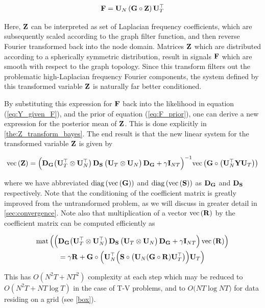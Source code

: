 \begin{equation}
    \label{eq:Z_transform}
    \mathbf{F} = \mathbf{U}_N \, (\mathbf{G} \circ \mathbf{Z}) \, \mathbf{U}_T^\top
\end{equation}

Here, $\mathbf{Z}$ can be interpreted as set of Laplacian frequency coefficients, which are subsequently scaled according to the graph filter function, and then reverse Fourier transformed back into the node domain. Matrices $\mathbf{Z}$ which are distributed according to a spherically symmetric distribution, result in signals $\mathbf{F}$ which are smooth with respect to the graph topology. Since this transform filters out the problematic high-Laplacian frequency Fourier components, the system defined by this transformed variable $\mathbf{Z}$ is naturally far better conditioned.

By substituting this expression for $\mathbf{F}$ back into the likelihood in equation (\ref{eq:Y_given_F}), and the prior of equation (\ref{eq:F_prior}), one can derive a new expression for the posterior mean of $\mathbf{Z}$. This is done explicitly in \cref{the:Z_transform_bayes}. The end result is that the new linear system for the transformed variable $\mathbf{Z}$ is given by


\begin{equation}
    \label{eq:Z_post}
    \text{\textup{vec}}\left(\mathbf{Z}\right) = \Big( \mathbf{D}_{\mathbf{G}} \big( \mathbf{U}_T^\top \otimes \mathbf{U}_N^\top \big)\, \mathbf{D}_{\mathbf{S}} \, \big(\mathbf{U}_T \otimes \mathbf{U}_N \big) \,\mathbf{D}_{\mathbf{G}} + \gamma \mathbf{I}_{NT} \Big)^{-1} \text{\textup{vec}}\left(\mathbf{G} \circ \big(\mathbf{U}_N^\top \mathbf{Y} \mathbf{U}_T\big)\right)
\end{equation}

\noindent where we have abbreviated $\text{\textup{diag}}\left(\text{\textup{vec}}\left(\mathbf{G}\right)\right)$ and $\text{\textup{diag}}\left(\text{\textup{vec}}\left(\mathbf{S}\right)\right)$ as $\mathbf{D}_{\mathbf{G}}$ and $\mathbf{D}_{\mathbf{S}}$ respectively. Note that the conditioning of the coefficient matrix is greatly improved from the untransformed problem, as we will discuss in greater detail in \cref{sec:convergence}. Note also that multiplication of a vector $\text{\textup{vec}}\left(\mathbf{R}\right)$ by the coefficient matrix can be computed efficiently as 

\begin{multline}
    \text{\textup{mat}}\left(\Big( \mathbf{D}_{\mathbf{G}} \big( \mathbf{U}_T^\top \otimes \mathbf{U}_N^\top \big)\, \mathbf{D}_{\mathbf{S}} \, \big(\mathbf{U}_T \otimes \mathbf{U}_N \big) \,\mathbf{D}_{\mathbf{G}} + \gamma \mathbf{I}_{NT} \Big) \, \text{\textup{vec}}\left(\mathbf{R}\right)\right) \\ = \gamma \mathbf{R} + \mathbf{G} \circ \left(\mathbf{U}_N^\top \Big( \mathbf{S} \circ \big(\mathbf{U}_N (\mathbf{G} \circ \mathbf{R}) \mathbf{U}_T^\top \big) \Big) \mathbf{U}_T\right) 
\end{multline}



This has $O(N^2T + NT^2)$ complexity at each step which may be  reduced to $O(N^2T + NT \log T)$ in the case of T-V problems, and to $O\big(NT \log NT \big)$ for data residing on a grid (see \cref{box}). 

